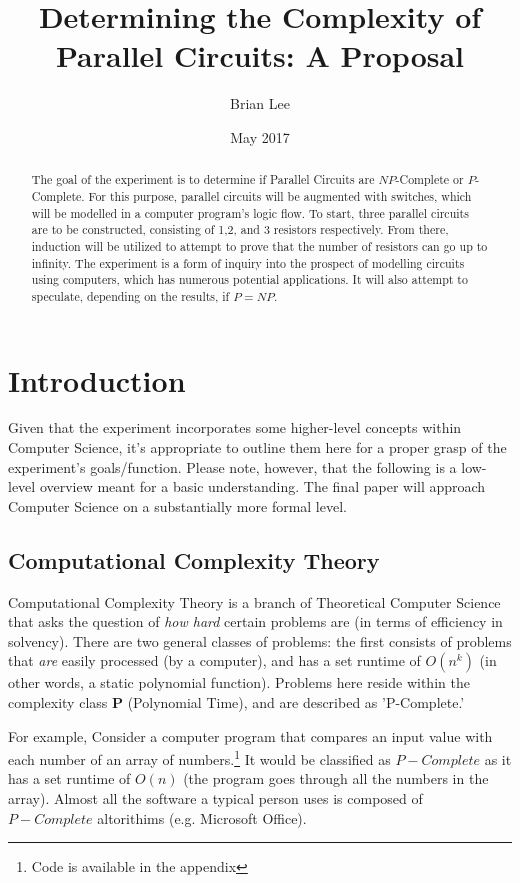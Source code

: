 \documentclass{article}
\title{Determining the Complexity of Parallel Circuits: A Proposal}
\date{May 2017}
\author{Brian Lee}
\begin{document}
\maketitle

\begin{abstract}
The goal of the experiment is to determine if Parallel Circuits are $NP$-Complete or $P$-Complete. For this purpose, parallel circuits will be augmented with switches, which will be modelled in a computer program's logic flow. To start, three parallel circuits are to be constructed, consisting of 1,2, and 3 resistors respectively. From there, induction will be utilized to attempt to prove that the number of resistors can go up to infinity. The experiment is a form of inquiry into the prospect of modelling circuits using computers, which has numerous potential applications. It will also attempt to speculate, depending on the results, if $P=NP$.
\end{abstract}

\section{Introduction}
Given that the experiment incorporates some higher-level concepts within Computer Science, it's appropriate to outline them here for a proper grasp of the experiment's goals/function. Please note, however, that the following is a low-level overview meant for a basic understanding. The final paper will approach Computer Science on a substantially more formal level. 
\subsection{Computational Complexity Theory}
Computational Complexity Theory is a branch of Theoretical Computer Science that asks the question of \textit{how hard} certain problems are (in terms of efficiency in solvency). There are two general classes of problems: the first consists of problems that \textit{are} easily processed (by a computer), and has a set runtime of $O(n^{k})$ (in other words, a static polynomial function). Problems here reside within the complexity class \textbf{P} (Polynomial Time), and are described as 'P-Complete.'\cite{michiel}

For example, Consider a computer program that compares an input value with each number of an array of numbers.\footnote{Code is available in the appendix} It would be classified as $P-Complete$ as it has a set runtime of $O(n)$ (the program goes through all the numbers in the array). Almost all the software a typical person uses is composed of $P-Complete$ altorithims (e.g. Microsoft Office).
\end{document}
